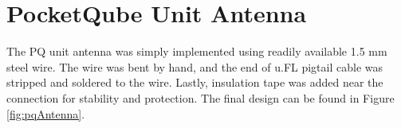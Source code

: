 \section{PocketQube Unit Antenna}

The PQ unit antenna was simply implemented using readily available 1.5 mm steel wire. The wire was bent by hand, and the end of u.FL pigtail cable was stripped and soldered to the wire. Lastly, insulation tape was added near the connection for stability and protection. The final design can be found in Figure \ref{fig:pqAntenna}.